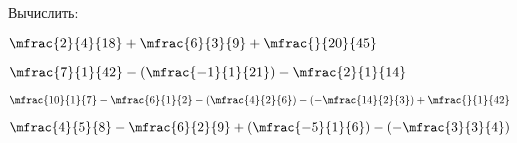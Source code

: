 \begin{class}[number=6]
\begin{listofex}
		\item Вычислить:
		\begin{enumcols}[itemcolumns=2]
			\item \( \mfrac{2}{4}{18}+\mfrac{6}{3}{9}+\mfrac{}{20}{45} \)
			\item \( \mfrac{7}{1}{42}-\left( \mfrac{-1}{1}{21} \right) - \mfrac{2}{1}{14}  \)
			\item \( \mfrac{10}{1}{7}-\mfrac{6}{1}{2}-\left( \mfrac{4}{2}{6} \right)-\left( -\mfrac{14}{2}{3} \right) + \mfrac{}{1}{42} \)
			\item \( \mfrac{4}{5}{8}-\mfrac{6}{2}{9}+\left( \mfrac{-5}{1}{6} \right)-\left( -\mfrac{3}{3}{4} \right) \)
		\end{enumcols}
	\end{listofex}
\end{class}
%
%
%
%	
%
%
%	
%
%
%	
